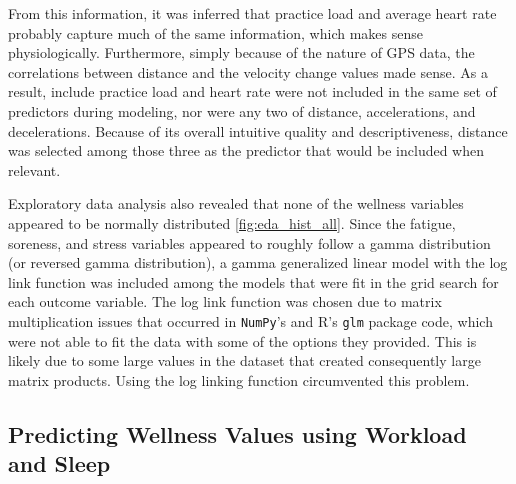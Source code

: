 \documentclass{article}
\begin{document}
			From this information, it was inferred that practice load
			and average heart rate probably capture much of the same
			information, which makes sense physiologically. Furthermore,
			simply because of the nature of GPS data, the correlations
			between distance and the velocity change values made sense.
			As a result, include practice load and heart rate were not
			included in
			the same set of predictors during modeling, nor were 
			any two of distance, accelerations, and decelerations. Because
			of its overall intuitive quality and descriptiveness,
			distance was selected among those three as the predictor that
			would be included when relevant.

			Exploratory data analysis also revealed that none of the wellness
			variables appeared to be normally distributed \ref{fig:eda_hist_all}.
			Since the fatigue, soreness, and stress variables appeared to roughly follow
			a gamma distribution (or reversed gamma distribution),
			a gamma generalized linear model with the log
			link function was included among the models that were fit in the grid
			search for each outcome variable. The log link function was chosen
			due to matrix multiplication issues that occurred in \texttt{NumPy}'s
			and R's \texttt{glm} package code, which were not able to fit the data
			with some of the options they provided. This is likely due to some
			large values in the dataset that created consequently large matrix products.
			Using the log linking function circumvented this problem.


		\subsection{Predicting Wellness Values using Workload and Sleep}
\end{document}

